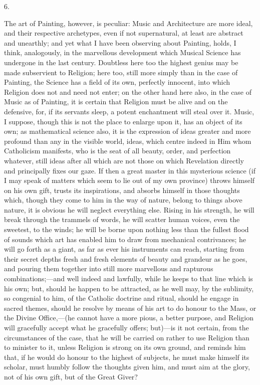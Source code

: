 6.

The art of Painting, however, is peculiar: Music and Architecture
are more ideal, and their respective archetypes, even if not
supernatural, at least are abstract and unearthly; and yet what I have
been observing about Painting, holds, I think, analogously, in the
marvellous development which Musical Science has undergone in the last
century. Doubtless here too the highest genius may be made subservient
to Religion; here too, still more simply than in the case of Painting,
the Science has a field of its own, perfectly innocent, into which
Religion does not and need not enter; on the other hand here also, in
the case of Music as of Painting, it is certain that Religion must be
alive and on the defensive, for, if its servants sleep, a potent
enchantment will steal over it. Music, I suppose, though this is not
the place to enlarge upon it, has an object of its own; as
mathematical science also, it is the expression of ideas greater and
more profound than any in the visible world, ideas, which centre
indeed in Him whom Catholicism manifests, who is the seat of all
beauty, order, and perfection whatever, still ideas after all which
are not those on which Revelation directly and principally fixes our
gaze. If then a great master in this mysterious science (if I may
speak of matters which seem to lie out of my own province) throws
himself on his own gift, trusts its inspirations, and absorbs himself
in those thoughts which, though they come to him in the way of nature,
belong to things above nature, it is obvious he will neglect
everything else. Rising in his strength, he will break through the
trammels of words, he will scatter human voices, even the sweetest, to
the winds; he will be borne upon nothing less than the fullest flood
of sounds which art has enabled him to draw from mechanical
contrivances; he will go forth as a giant, as far as ever his
instruments can reach, starting from their secret depths fresh and
fresh elements of beauty and grandeur as he goes, and pouring them
together into still more marvellous and rapturous combinations;—and
well indeed and lawfully, while he keeps to that line which is his
own; but, should he happen to be attracted, as he well may, by the
sublimity, so congenial to him, of the Catholic doctrine and ritual,
should he engage in sacred themes, should he resolve by means of his
art to do honour to the Mass, or the Divine Office,—(he cannot have
a more pious, a better purpose, and Religion will gracefully accept
what he gracefully offers; but)—is it not certain, from the
circumstances of the case, that he will be carried on rather to use
Religion than to minister to it, unless Religion is strong on its own
ground, and reminds him that, if he would do honour to the highest of
subjects, he must make himself its scholar, must humbly follow the
thoughts given him, and must aim at the glory, not of his own gift,
but of the Great Giver?


